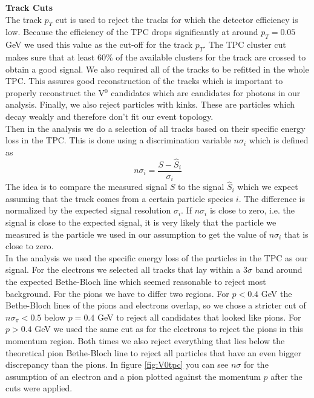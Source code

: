 \textbf{Track Cuts}\\
The track $p_T$ cut is used to reject the tracks for which the detector efficiency is low. Because the efficiency of the TPC drops significantly at around $p_T = 0.05$ GeV we used this value as the cut-off for the track $p_T$. The TPC cluster cut makes sure that at least 60\% of the available clusters for the track are crossed to obtain a good signal. We also required all of the tracks to be refitted in the whole TPC. This assures good reconstruction of the tracks which is important to properly reconstruct the V$^0$ candidates which are candidates for photons in our analysis. Finally, we also reject particles with kinks. These are particles which decay weakly and therefore don't fit our event topology. \\
Then in the analysis we do a selection of all tracks based on their specific energy loss in the TPC. This is done using a discrimination variable $n\sigma_i$ which is defined as
\begin{equation}
n\sigma_i = \frac{S-\hat{S}_i}{\sigma_i}
\end{equation}
The idea is to compare the measured signal $S$ to the signal $\hat{S}_i$ which we expect assuming that the track comes from a certain particle species $i$. The difference is normalized by the expected signal resolution $\sigma_i$. If $n\sigma_i$ is close to zero, i.e. the signal is close to the expected signal, it is very likely that the particle we measured is the particle we used in our assumption to get the value of $n\sigma_i$ that is close to zero. \\
In the analysis we used the specific energy loss of the particles in the TPC as our signal. For the electrons we selected all tracks that lay within a 3$\sigma$ band around the expected Bethe-Bloch line which seemed reasonable to reject most background. For the pions we have to differ two regions. For $p < 0.4$ GeV the Bethe-Bloch lines of the pions and electrons overlap, so we chose a stricter cut of $n\sigma_{\pi} < 0.5$ below $p = 0.4$ GeV to reject all candidates that looked like pions. For $p > 0.4$ GeV we used the same cut as for the electrons to reject the pions in this momentum region. Both times we also reject everything that lies below the theoretical pion Bethe-Bloch line to reject all particles that have an even bigger discrepancy than the pions. In figure \ref{fig:V0tpc} you can see $n\sigma$ for the assumption of an electron and a pion plotted against the momentum $p$ after the cuts were applied. \\
